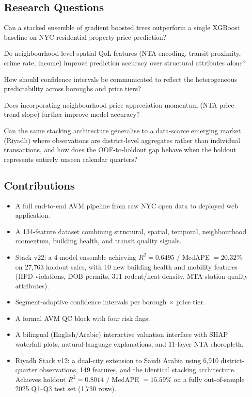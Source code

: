 \documentclass[11pt, a4paper, twoside]{article}
\begin{document}
\subsection{Research Questions}
\begin{description}[style=nextline]
  \item[RQ1] Can a stacked ensemble of gradient boosted trees outperform a
             single XGBoost baseline on NYC residential property price
             prediction?
  \item[RQ2] Do neighbourhood-level spatial QoL features (NTA encoding,
             transit proximity, crime rate, income) improve prediction accuracy
             over structural attributes alone?
  \item[RQ3] How should confidence intervals be communicated to reflect the
             heterogeneous predictability across boroughs and price tiers?
  \item[RQ4] Does incorporating neighbourhood price appreciation momentum
             (NTA price trend slope) further improve model accuracy?
  \item[RQ5] Can the same stacking architecture generalise to a data-scarce
             emerging market (Riyadh) where observations are district-level
             aggregates rather than individual transactions, and how does the
             OOF-to-holdout gap behave when the holdout represents entirely
             unseen calendar quarters?
\end{description}

\subsection{Contributions}
\begin{itemize}
  \item A full end-to-end AVM pipeline from raw NYC open data to deployed web
        application.
  \item A 134-feature dataset combining structural, spatial, temporal,
        neighbourhood momentum, building health, and transit quality signals.
  \item Stack v22: a 4-model ensemble achieving $R^2 = 0.6495$ / MedAPE
        $= 20.32\%$ on 27,763 holdout sales, with 10 new building health
        and mobility features (HPD violations, DOB permits, 311 rodent/heat
        density, MTA station quality attributes).
  \item Segment-adaptive confidence intervals per borough $\times$ price tier.
  \item A formal AVM QC block with four risk flags.
  \item A bilingual (English/Arabic) interactive valuation interface with SHAP
        waterfall plots, natural-language explanations, and 11-layer NTA
        choropleth.
  \item Riyadh Stack v12: a dual-city extension to Saudi Arabia using 6,910
        district-quarter observations, 149 features, and the identical stacking
        architecture. Achieves holdout $R^2 = 0.8014$ / MedAPE $= 15.59\%$ on
        a fully out-of-sample 2025 Q1--Q3 test set (1,730 rows).
\end{itemize}
\end{document}
